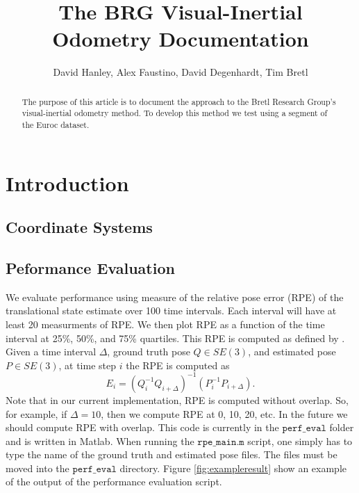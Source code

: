 \documentclass[11pt,a4paper]{article}
\title{The BRG Visual-Inertial Odometry Documentation}
\author{David Hanley, Alex Faustino, David Degenhardt, Tim Bretl}
\begin{document}
\maketitle

\begin{abstract}
 The purpose of this article is to document the approach to the Bretl Research Group's visual-inertial odometry method. To develop this method we test using a segment of the Euroc dataset.
\end{abstract}

\section{Introduction}

\subsection{Coordinate Systems}

\subsection{Peformance Evaluation}
We evaluate performance using measure of the relative pose error (RPE) of the translational state estimate over 100 time intervals. Each interval will have at least 20 measurments of RPE. We then plot RPE as a function of the time interval at 25\%, 50\%, and 75\% quartiles. This RPE is computed as defined by  \cite{Sturm:2012}. Given a time interval $\Delta$, ground truth pose $Q\in SE(3)$, and estimated pose $P\in SE(3)$, at time step $i$ the RPE is computed as
\begin{equation}
	E_i = \left(Q_i^{-1}Q_{i+\Delta}\right)^{-1}\left(P_i^{-1}P_{i+\Delta}\right).
\end{equation}
Note that in our current implementation, RPE is computed without overlap. So, for example, if $\Delta=10$, then we compute RPE at 0, 10, 20, etc. In the future we should compute RPE with overlap. This code is currently in the $\texttt{perf\_eval}$ folder and is written in Matlab. When running the $\texttt{rpe\_main.m}$ script, one simply has to type the name of the ground truth and estimated pose files. The files must be moved into the $\texttt{perf\_eval}$ directory. Figure \ref{fig:exampleresult} show an example of the output of the performance evaluation script.
\end{document}

